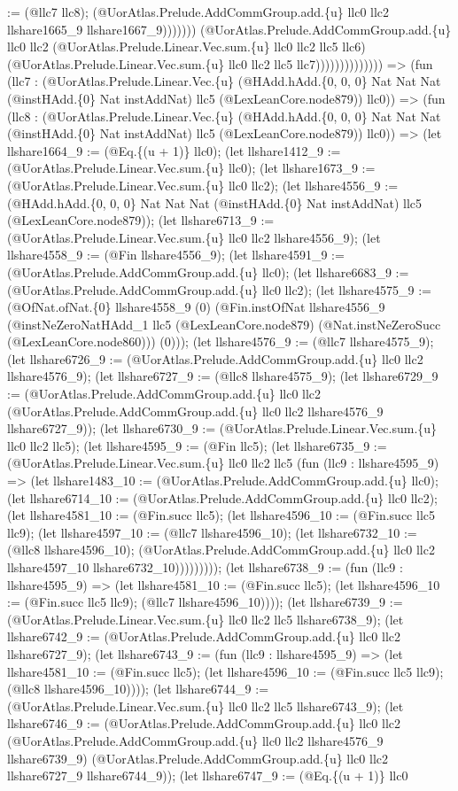 \documentclass[11pt]{article}
\begin{document}
:= (@llc7 llc8); (@UorAtlas.Prelude.AddCommGroup.add.\{u\} llc0 llc2 llshare1665\_9 llshare1667\_9))))))) (@UorAtlas.Prelude.AddCommGroup.add.\{u\} llc0 llc2 (@UorAtlas.Prelude.Linear.Vec.sum.\{u\} llc0 llc2 llc5 llc6) (@UorAtlas.Prelude.Linear.Vec.sum.\{u\} llc0 llc2 llc5 llc7)))))))))))))) => (fun (llc7 : (@UorAtlas.Prelude.Linear.Vec.\{u\} (@HAdd.hAdd.\{0, 0, 0\} Nat Nat Nat (@instHAdd.\{0\} Nat instAddNat) llc5 (@LexLeanCore.node879)) llc0)) => (fun (llc8 : (@UorAtlas.Prelude.Linear.Vec.\{u\} (@HAdd.hAdd.\{0, 0, 0\} Nat Nat Nat (@instHAdd.\{0\} Nat instAddNat) llc5 (@LexLeanCore.node879)) llc0)) => (let llshare1664\_9 := (@Eq.\{(u + 1)\} llc0); (let llshare1412\_9 := (@UorAtlas.Prelude.Linear.Vec.sum.\{u\} llc0); (let llshare1673\_9 := (@UorAtlas.Prelude.Linear.Vec.sum.\{u\} llc0 llc2); (let llshare4556\_9 := (@HAdd.hAdd.\{0, 0, 0\} Nat Nat Nat (@instHAdd.\{0\} Nat instAddNat) llc5 (@LexLeanCore.node879)); (let llshare6713\_9 := (@UorAtlas.Prelude.Linear.Vec.sum.\{u\} llc0 llc2 llshare4556\_9); (let llshare4558\_9 := (@Fin llshare4556\_9); (let llshare4591\_9 := (@UorAtlas.Prelude.AddCommGroup.add.\{u\} llc0); (let llshare6683\_9 := (@UorAtlas.Prelude.AddCommGroup.add.\{u\} llc0 llc2); (let llshare4575\_9 := (@OfNat.ofNat.\{0\} llshare4558\_9 (0) (@Fin.instOfNat llshare4556\_9 (@instNeZeroNatHAdd\_1 llc5 (@LexLeanCore.node879) (@Nat.instNeZeroSucc (@LexLeanCore.node860))) (0))); (let llshare4576\_9 := (@llc7 llshare4575\_9); (let llshare6726\_9 := (@UorAtlas.Prelude.AddCommGroup.add.\{u\} llc0 llc2 llshare4576\_9); (let llshare6727\_9 := (@llc8 llshare4575\_9); (let llshare6729\_9 := (@UorAtlas.Prelude.AddCommGroup.add.\{u\} llc0 llc2 (@UorAtlas.Prelude.AddCommGroup.add.\{u\} llc0 llc2 llshare4576\_9 llshare6727\_9)); (let llshare6730\_9 := (@UorAtlas.Prelude.Linear.Vec.sum.\{u\} llc0 llc2 llc5); (let llshare4595\_9 := (@Fin llc5); (let llshare6735\_9 := (@UorAtlas.Prelude.Linear.Vec.sum.\{u\} llc0 llc2 llc5 (fun (llc9 : llshare4595\_9) => (let llshare1483\_10 := (@UorAtlas.Prelude.AddCommGroup.add.\{u\} llc0); (let llshare6714\_10 := (@UorAtlas.Prelude.AddCommGroup.add.\{u\} llc0 llc2); (let llshare4581\_10 := (@Fin.succ llc5); (let llshare4596\_10 := (@Fin.succ llc5 llc9); (let llshare4597\_10 := (@llc7 llshare4596\_10); (let llshare6732\_10 := (@llc8 llshare4596\_10); (@UorAtlas.Prelude.AddCommGroup.add.\{u\} llc0 llc2 llshare4597\_10 llshare6732\_10))))))))); (let llshare6738\_9 := (fun (llc9 : llshare4595\_9) => (let llshare4581\_10 := (@Fin.succ llc5); (let llshare4596\_10 := (@Fin.succ llc5 llc9); (@llc7 llshare4596\_10)))); (let llshare6739\_9 := (@UorAtlas.Prelude.Linear.Vec.sum.\{u\} llc0 llc2 llc5 llshare6738\_9); (let llshare6742\_9 := (@UorAtlas.Prelude.AddCommGroup.add.\{u\} llc0 llc2 llshare6727\_9); (let llshare6743\_9 := (fun (llc9 : llshare4595\_9) => (let llshare4581\_10 := (@Fin.succ llc5); (let llshare4596\_10 := (@Fin.succ llc5 llc9); (@llc8 llshare4596\_10)))); (let llshare6744\_9 := (@UorAtlas.Prelude.Linear.Vec.sum.\{u\} llc0 llc2 llc5 llshare6743\_9); (let llshare6746\_9 := (@UorAtlas.Prelude.AddCommGroup.add.\{u\} llc0 llc2 (@UorAtlas.Prelude.AddCommGroup.add.\{u\} llc0 llc2 llshare4576\_9 llshare6739\_9) (@UorAtlas.Prelude.AddCommGroup.add.\{u\} llc0 llc2 llshare6727\_9 llshare6744\_9)); (let llshare6747\_9 := (@Eq.\{(u + 1)\} llc0 
\end{document}
